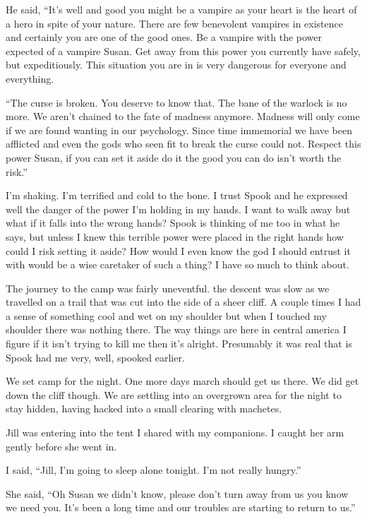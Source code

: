 He said, ``It's well and good you might be a vampire as your heart is the heart of a hero in spite of your nature. There are few benevolent vampires in existence and certainly you are one of the good ones. Be a vampire with the power expected of a vampire Susan. Get away from this power you currently have safely, but expeditiously. This situation you are in is very dangerous for everyone and everything.

``The curse is broken. You deserve to know that. The bane of the warlock is no more. We aren't chained to the fate of madness anymore. Madness will only come if we are found wanting in our psychology. Since time immemorial we have been afflicted and even the gods who seen fit to break the curse could not. Respect this power Susan, if you can set it aside do it the good you can do isn't worth the risk.''

I'm shaking. I'm terrified and cold to the bone. I trust Spook and he expressed well the danger of the power I'm holding in my hands. I want to walk away but what if it falls into the wrong hands? Spook is thinking of me too in what he says, but unless I knew this terrible power were placed in the right hands how could I risk setting it aside? How would I even know the god I should entrust it with would be a wise caretaker of such a thing? I have so much to think about.

The journey to the camp was fairly uneventful. the descent was slow as we travelled on a trail that was cut into the side of a sheer cliff. A couple times I had a sense of something cool and wet on my shoulder but when I touched my shoulder there was nothing there. The way things are here in central america I figure if it isn't trying to kill me then it's alright. Presumably it was real that is Spook had me very, well, spooked earlier.

We set camp for the night. One more days march should get us there. We did get down the cliff though. We are settling into an overgrown area for the night to stay hidden, having hacked into a small clearing with machetes.

Jill was entering into the tent I shared with my companions. I caught her arm gently before she went in.

I said, ``Jill, I'm going to sleep alone tonight. I'm not really hungry.''

She said, ``Oh Susan we didn't know, please don't turn away from us you know we need you. It's been a long time and our troubles are starting to return to us.''

